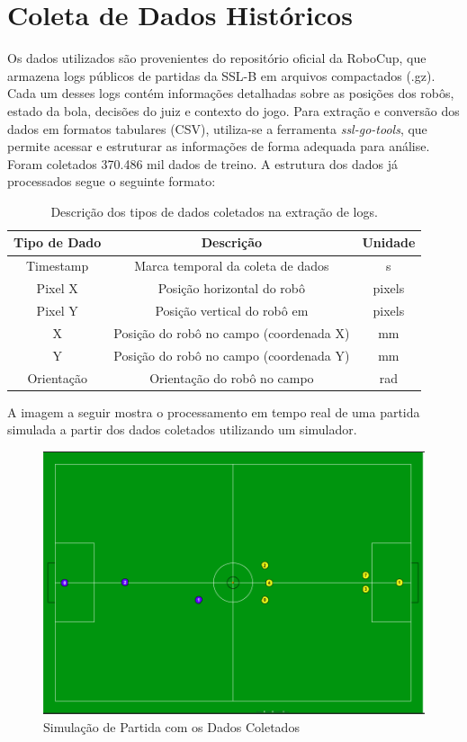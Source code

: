 \section{Coleta de Dados Históricos} 


Os dados utilizados são provenientes do repositório oficial da RoboCup, que armazena logs públicos de partidas da SSL-B em arquivos compactados (.gz). Cada um desses logs contém informações detalhadas sobre as posições dos robôs, estado da bola, decisões do juiz e contexto do jogo. Para extração e conversão dos dados em formatos tabulares (CSV), utiliza-se a ferramenta \textit{ssl-go-tools}, que permite acessar e estruturar as informações de forma adequada para análise. Foram coletados 370.486 mil dados de treino. A estrutura dos dados já processados segue o seguinte formato:

\begin{table}[h!]
\centering
\caption{Descrição dos tipos de dados coletados na extração de logs.}
\begin{tabular}{c | c c}
\hline
\textbf{Tipo de Dado} & \textbf{Descrição} & Unidade\\
\hline
Timestamp & Marca temporal da coleta de dados & s\\
Pixel X & Posição horizontal do robô & pixels \\
Pixel Y & Posição vertical do robô em & pixels \\
X & Posição do robô no campo (coordenada X) & mm \\
Y & Posição do robô no campo (coordenada Y) & mm\\
Orientação & Orientação do robô no campo  & rad\\
\hline
\end{tabular}
\end{table}

A imagem a seguir mostra o processamento em tempo real de uma partida simulada a partir dos dados coletados utilizando um simulador.

\begin{figure}[!htpb]
    \centering
    \caption{Simulação de Partida com os Dados Coletados}
    \label{partida_ssl_log_player}
    \includegraphics[width=0.8\linewidth]{figuras/partida_ssl.png}
\end{figure}



